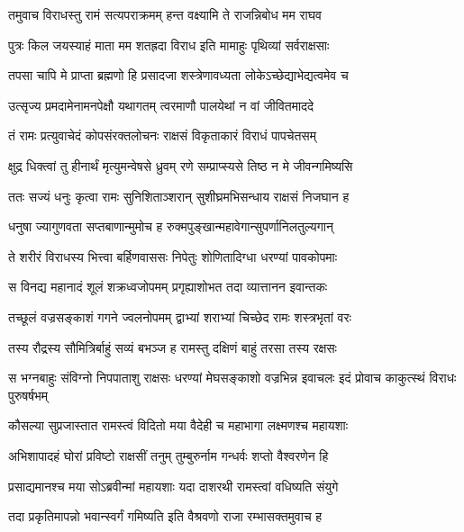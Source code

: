 \twolineshloka
{तमुवाच विराधस्तु रामं सत्यपराक्रमम्}
{हन्त वक्ष्यामि ते राजन्निबोध मम राघव} %

\twolineshloka
{पुत्रः किल जयस्याहं माता मम शतह्रदा}
{विराध इति मामाहुः पृथिव्यां सर्वराक्षसाः} %

\twolineshloka
{तपसा चापि मे प्राप्ता ब्रह्मणो हि प्रसादजा}
{शस्त्रेणावध्यता लोकेऽच्छेद्याभेद्यत्वमेव च} %

\twolineshloka
{उत्सृज्य प्रमदामेनामनपेक्षौ यथागतम्}
{त्वरमाणौ पालयेथां न वां जीवितमाददे} %

\twolineshloka
{तं रामः प्रत्युवाचेदं कोपसंरक्तलोचनः}
{राक्षसं विकृताकारं विराधं पापचेतसम्} %

\twolineshloka
{क्षुद्र धिक्त्वां तु हीनार्थं मृत्युमन्वेषसे ध्रुवम्}
{रणे सम्प्राप्स्यसे तिष्ठ न मे जीवन्गमिष्यसि} %

\twolineshloka
{ततः सज्यं धनुः कृत्वा रामः सुनिशिताञ्शरान्}
{सुशीघ्रमभिसन्धाय राक्षसं निजघान ह} %

\twolineshloka
{धनुषा ज्यागुणवता सप्तबाणान्मुमोच ह}
{रुक्मपुङ्खान्महावेगान्सुपर्णानिलतुल्यगान्} %

\twolineshloka
{ते शरीरं विराधस्य भित्त्वा बर्हिणवाससः}
{निपेतुः शोणितादिग्धा धरण्यां पावकोपमाः} %

\twolineshloka
{स विनद्य महानादं शूलं शक्रध्वजोपमम्}
{प्रगृह्याशोभत तदा व्यात्तानन इवान्तकः} %

\twolineshloka
{तच्छूलं वज्रसङ्काशं गगने ज्वलनोपमम्}
{द्वाभ्यां शराभ्यां चिच्छेद रामः शस्त्रभृतां वरः} %

\twolineshloka
{तस्य रौद्रस्य सौमित्रिर्बाहुं सव्यं बभञ्ज ह}
{रामस्तु दक्षिणं बाहुं तरसा तस्य रक्षसः} %

\threelineshloka
{स भग्नबाहुः संविग्नो निपपाताशु राक्षसः}
{धरण्यां मेघसङ्काशो वज्रभिन्न इवाचलः}
{इदं प्रोवाच काकुत्स्थं विराधः पुरुषर्षभम्} %

\twolineshloka
{कौसल्या सुप्रजास्तात रामस्त्वं विदितो मया}
{वैदेही च महाभागा लक्ष्मणश्च महायशाः} %

\twolineshloka
{अभिशापादहं घोरां प्रविष्टो राक्षसीं तनुम्}
{तुम्बुरुर्नाम गन्धर्वः शप्तो वैश्वरणेन हि} %

\twolineshloka
{प्रसाद्यमानश्च मया सोऽब्रवीन्मां महायशाः}
{यदा दाशरथी रामस्त्वां वधिष्यति संयुगे} %

\twolineshloka
{तदा प्रकृतिमापन्नो भवान्स्वर्गं गमिष्यति}
{इति वैश्रवणो राजा रम्भासक्तमुवाच ह} %

